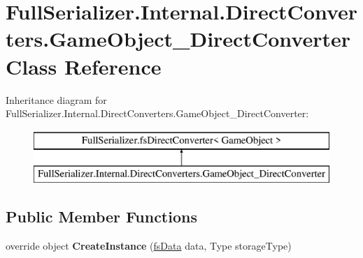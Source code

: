 \hypertarget{class_full_serializer_1_1_internal_1_1_direct_converters_1_1_game_object___direct_converter}{}\section{Full\+Serializer.\+Internal.\+Direct\+Converters.\+Game\+Object\+\_\+\+Direct\+Converter Class Reference}
\label{class_full_serializer_1_1_internal_1_1_direct_converters_1_1_game_object___direct_converter}
Inheritance diagram for Full\+Serializer.\+Internal.\+Direct\+Converters.\+Game\+Object\+\_\+\+Direct\+Converter\+:\begin{figure}[H]
\begin{center}
\leavevmode
\includegraphics[height=2.000000cm]{class_full_serializer_1_1_internal_1_1_direct_converters_1_1_game_object___direct_converter}
\end{center}
\end{figure}
\subsection*{Public Member Functions}
\begin{DoxyCompactItemize}
\item 
\mbox{\label{class_full_serializer_1_1_internal_1_1_direct_converters_1_1_game_object___direct_converter_a0466ce2803d3ffa8034c849c523d20b7}} 
override object {\bfseries Create\+Instance} (\hyperlink{class_full_serializer_1_1fs_data}{fs\+Data} data, Type storage\+Type)
\end{DoxyCompactItemize}
